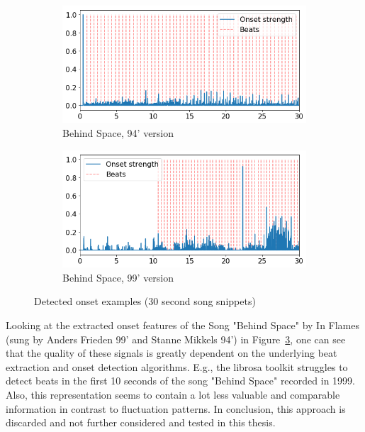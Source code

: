 \begin{figure}[htbp]
{{			\begin{subfigure}{.495\textwidth}
				\centering    
				\includegraphics[scale=0.3]{Images/Beat/s_s_on.png}
				\caption{Behind Space, 94' version}
				\label{saon}
			\end{subfigure}		
			\begin{subfigure}{.495\textwidth}
				\centering     
				\includegraphics[scale=0.3]{Images/Beat/s_a_on.png}
				\caption{Behind Space, 99' version}
				\label{sson}
			\end{subfigure}%
				
	}}
	\caption{Detected onset examples (30 second song snippets)}
	\label{fig:ons1}
\end{figure}	

\noindent Looking at the extracted onset features of the Song "Behind Space" by In Flames (sung by Anders Frieden 99' and Stanne Mikkels 94') in Figure~\ref{fig:ons1}, one can see that the quality of these signals is greatly dependent on the underlying beat extraction and onset detection algorithms. E.g., the librosa toolkit struggles to detect beats in the first 10 seconds of the song "Behind Space" recorded in 1999. Also, this representation seems to contain a lot less valuable and comparable information in contrast to fluctuation patterns. In conclusion, this approach is discarded and not further considered and tested in this thesis.  

